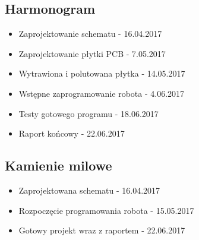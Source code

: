 \documentclass[12pt,a4paper]{article}
\begin{document}
\subsection{Harmonogram}

\begin{itemize}

\item Zaprojektowanie schematu - 16.04.2017

\item Zaprojektowanie płytki PCB - 7.05.2017

\item Wytrawiona i polutowana płytka - 14.05.2017

\item Wstępne zaprogramowanie robota - 4.06.2017

\item Testy gotowego programu - 18.06.2017

\item Raport końcowy - 22.06.2017

\end{itemize}

\subsection{Kamienie milowe}

\begin{itemize}
\item Zaprojektowana schematu - 16.04.2017

\item Rozpoczęcie programowania robota - 15.05.2017

\item Gotowy projekt wraz z raportem - 22.06.2017
\end{itemize}






\clearpage
\end{document}
